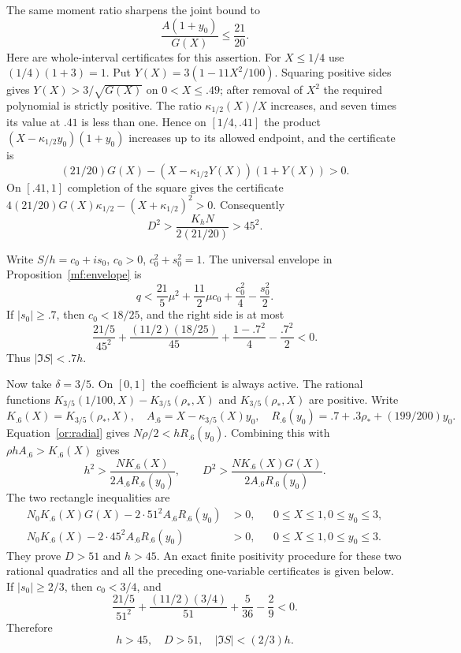 The same moment ratio sharpens the joint bound to
\begin{equation}\label{or:T-joint-gap}
                  \frac{A(1+y_0)}{G(X)}\le\frac{21}{20}.
\end{equation}
Here are whole-interval certificates for this assertion.  For
$X\le1/4$ use $(1/4)(1+3)=1$.  Put
$Y(X)=3(1-11X^2/100)$.  Squaring positive sides gives
$Y(X)>3/\sqrt{G(X)}$ on $0<X\le.49$; after removal of $X^2$ the
required polynomial is strictly positive.  The ratio
$\kappa_{1/2}(X)/X$ increases, and seven times its value at $.41$
is less than one.  Hence on $[1/4,.41]$ the product
$(X-\kappa_{1/2}y_0)(1+y_0)$ increases up to its allowed endpoint,
and the certificate is
\[
 (21/20)G(X)-(X-\kappa_{1/2}Y(X))(1+Y(X))>0.
\]
On $[.41,1]$ completion of the square gives the certificate
$4(21/20)G(X)\kappa_{1/2}-(X+\kappa_{1/2})^2>0$.
Consequently
\begin{equation}\label{or:T-D45}
                 D^2>\frac{K_hN}{2(21/20)}>45^2.
\end{equation}

Write $S/h=c_0+is_0$, $c_0>0$, $c_0^2+s_0^2=1$.
The universal envelope in Proposition~\ref{mf:envelope} is
\begin{equation}\label{or:T-matrix}
 q<\frac{21}{5}\mu^2+\frac{11}{2}\mu c_0
                         +\frac{c_0^2}{4}-\frac{s_0^2}{2}.
\end{equation}
If $|s_0|\ge.7$, then $c_0<18/25$, and the right side is at most
\[
 \frac{21/5}{45^2}+\frac{(11/2)(18/25)}{45}
                       +\frac{1-.7^2}{4}-\frac{.7^2}{2}<0.
\]
Thus $|\Im S|<.7h$.

Now take $\delta=3/5$.  On $[0,1]$ the coefficient is always active.
The rational functions
$K_{3/5}(1/100,X)-K_{3/5}(\rho_*,X)$ and
$K_{3/5}(\rho_*,X)$ are positive.  Write
\[
 K_{.6}(X)=K_{3/5}(\rho_*,X),\quad
 A_{.6}=X-\kappa_{3/5}(X)y_0,\quad
 R_{.6}(y_0)=.7+.3\rho_*+(199/200)y_0.
\]
Equation~\eqref{or:radial} gives $N\rho/2<hR_{.6}(y_0)$.
Combining this with $\rho hA_{.6}>K_{.6}(X)$ gives
\[
 h^2>\frac{NK_{.6}(X)}{2A_{.6}R_{.6}(y_0)},\qquad
 D^2>\frac{NK_{.6}(X)G(X)}{2A_{.6}R_{.6}(y_0)}.
\]
The two rectangle inequalities are
\begin{align}
 N_0K_{.6}(X)G(X)-2\cdot51^2 A_{.6}R_{.6}(y_0)&>0,
       &&0\le X\le1, 0\le y_0\le3,\label{or:T-D51-poly}\\
 N_0K_{.6}(X)-2\cdot45^2 A_{.6}R_{.6}(y_0)&>0,
       &&0\le X\le1, 0\le y_0\le3.\label{or:T-h45-poly}
\end{align}
They prove $D>51$ and $h>45$.  An exact finite positivity procedure
for these two rational quadratics and all the preceding one-variable
certificates is given below.  If $|s_0|\ge2/3$, then $c_0<3/4$, and
\[
 \frac{21/5}{51^2}+\frac{(11/2)(3/4)}{51}
                                  +\frac5{36}-\frac29<0.
\]
Therefore
\begin{equation}\label{or:T-prephase}
                      h>45,\quad D>51,\quad |\Im S|<(2/3)h.
\end{equation}

